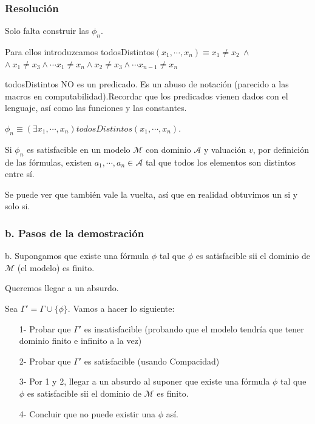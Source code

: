 \documentclass{beamer}
\begin{document}
\begin{frame}
\frametitle{Resolución}

Solo falta construir las $\phi_n$.

\pause

\bigskip


Para ellos introduzcamos todosDistintos$(x_1,\cdots,x_n)  \equiv x_1 \neq x_2\ \land$\\$ \land\  x_1 \neq x_3 \land \cdots x_1 \neq x_n \land x_2 \neq x_3 \land \cdots x_{n-1} \neq x_n$


todosDistintos NO es un predicado. Es un abuso de notación (parecido a las macros en computabilidad).Recordar que los predicados vienen dados con el lenguaje, así como las funciones y las constantes.

\pause

\bigskip

$\phi_n \equiv (\exists x_1,\cdots, x_n) todosDistintos(x_1,\cdots, x_n)$.

\bigskip

Si $\phi_n$ es satisfacible en un modelo $\mathcal{M}$ con dominio $\mathcal{A}$ y valuación $v$, por definición de las fórmulas, existen $a_1,\cdots, a_n \in \mathcal{A}$ tal que todos los elementos son distintos entre sí.

Se puede ver que también vale la vuelta, así que en realidad obtuvimos un si y solo si.
	
\end{frame}

\begin{frame}
\frametitle{b. Pasos de la demostración}

b. Supongamos que existe una fórmula $\phi$ tal que $\phi$ es satisfacible sii el dominio de $\mathcal{M}$ (el modelo) es finito.

Queremos llegar a un absurdo.

\pause

\bigskip 
Sea $\Gamma' = \Gamma \cup \{\phi\}$. Vamos a hacer lo siguiente:



\begin{enumerate}
		\item[1-] Probar que $\Gamma'$ es insatisfacible (probando que el modelo tendría que tener dominio finito e infinito a la vez)
		\item[2-] Probar que $\Gamma'$ es satisfacible (usando Compacidad)
		\item[3-] Por 1 y 2, llegar a un absurdo al suponer que existe una fórmula $\phi$ tal que $\phi$ es satisfacible sii el dominio de $\mathcal{M}$ es finito.
		\item[4-] Concluir que  no puede existir una $\phi$ así.		
	
\end{enumerate}
\end{frame}
\end{document}
